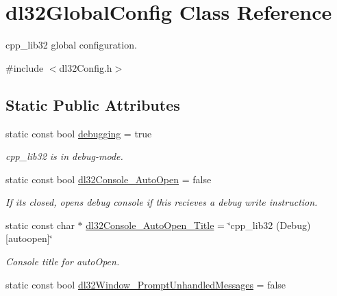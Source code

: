 \hypertarget{classdl32_global_config}{\section{dl32\-Global\-Config Class Reference}
\label{classdl32_global_config}
}


cpp\-\_\-lib32 global configuration.  




{\ttfamily \#include $<$dl32\-Config.\-h$>$}

\subsection*{Static Public Attributes}
\begin{DoxyCompactItemize}
\item 
\hypertarget{classdl32_global_config_a5d9deb0b058e2e2457d57927ee1f14f1}{static const bool \hyperlink{classdl32_global_config_a5d9deb0b058e2e2457d57927ee1f14f1}{debugging} = true}\label{classdl32_global_config_a5d9deb0b058e2e2457d57927ee1f14f1}

\begin{DoxyCompactList}\small\item\em cpp\-\_\-lib32 is in debug-\/mode. \end{DoxyCompactList}\item 
\hypertarget{classdl32_global_config_ae6e7968b0cfe7703aa800db60747f0db}{static const bool \hyperlink{classdl32_global_config_ae6e7968b0cfe7703aa800db60747f0db}{dl32\-Console\-\_\-\-Auto\-Open} = false}\label{classdl32_global_config_ae6e7968b0cfe7703aa800db60747f0db}

\begin{DoxyCompactList}\small\item\em If its closed, opens debug console if this recieves a debug write instruction. \end{DoxyCompactList}\item 
\hypertarget{classdl32_global_config_a699bec231b8aa824648afca073c11da7}{static const char $\ast$ \hyperlink{classdl32_global_config_a699bec231b8aa824648afca073c11da7}{dl32\-Console\-\_\-\-Auto\-Open\-\_\-\-Title} = \char`\"{}cpp\-\_\-lib32 (Debug) \mbox{[}autoopen\mbox{]}\char`\"{}}\label{classdl32_global_config_a699bec231b8aa824648afca073c11da7}

\begin{DoxyCompactList}\small\item\em Console title for auto\-Open. \end{DoxyCompactList}\item 
\hypertarget{classdl32_global_config_ac4afba1e07c557f5139514162ac83772}{static const bool \hyperlink{classdl32_global_config_ac4afba1e07c557f5139514162ac83772}{dl32\-Window\-\_\-\-Prompt\-Unhandled\-Messages} = false}\label{classdl32_global_config_ac4afba1e07c557f5139514162ac83772}


\end{DoxyCompactItemize}
